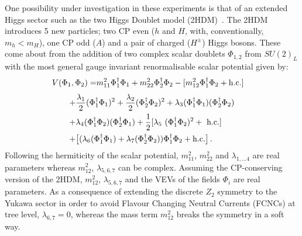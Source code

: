One possibility under investigation in these experiments is that of an extended Higgs sector
such as the two Higgs Doublet model (2HDM)~\cite{Branco2012THDM}.
The 2HDM introduces 5 new particles;
two CP even (\(h\) and \(H\), with, conventionally, \(m_h < m_H\)),
one CP odd (\(A\))
and a pair of charged (\(H^\pm\)) Higgs bosons.
These come about from the addition of two complex scalar doublets \(\Phi_{1,2}\) from \(SU(2)_L\) with 
the most general gauge invariant renormalisable scalar potential given by:
\begin{align}\nonumber
V(\Phi_1,\Phi_2) =& m_{11}^2\Phi_1^\dagger\Phi_1+m_{22}^2\Phi_2^\dagger\Phi_2-[m_{12}^2\Phi_1^\dagger\Phi_2+{\rm h.c.}] \nonumber
\end{align}
\begin{align}
+& \frac{\lambda_1}{2}(\Phi_1^\dagger\Phi_1)^2
+\frac{\lambda_2}{2}(\Phi_2^\dagger\Phi_2)^2
+\lambda_3(\Phi_1^\dagger\Phi_1)(\Phi_2^\dagger\Phi_2)\nonumber\\
+&\lambda_4(\Phi_1^\dagger\Phi_2)(\Phi_2^\dagger\Phi_1) 
+\frac{1}{2}[\lambda_5~(\Phi_1^\dagger\Phi_2)^2 +~{\rm h.c.}]\nonumber\\
+&\big[ (\lambda_6(\Phi_1^\dagger\Phi_1)
+\lambda_7(\Phi_2^\dagger\Phi_2))
\Phi_1^\dagger\Phi_2+{\rm h.c.}\big] \,. \label{pot1}
\end{align}
Following the hermiticity of the scalar potential, \(m_{11}^2\), \(m_{22}^2\) and \(\lambda_{1,\ldots4}\) are real parameters
whereas \(m_{12}^2\), \(\lambda_{5,6,7}\) can be complex.
Assuming the CP-conserving version of the 2HDM, \(m_{12}^2\), \(\lambda_{5,6,7}\) and the VEVs of the fields \(\Phi_i\) are real parameters.
As a consequence of extending the discrete \(Z_2\) symmetry to the Yukawa sector in order to avoid Flavour Changing Neutral Currents (FCNCs) at tree level,
\(\lambda_{6,7}=0\), whereas the mass term \(m_{12}^2\) breaks the symmetry in a soft way.

